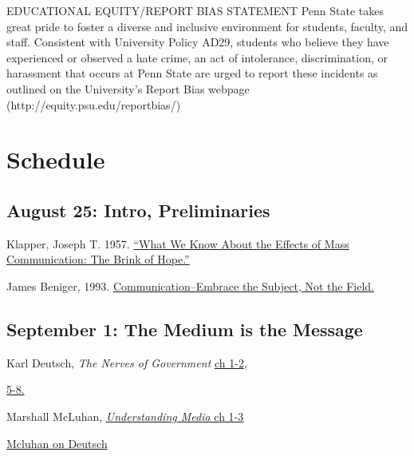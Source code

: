\vspace{-.1in}\documentclass[11pt]{article}
\begin{document}
EDUCATIONAL EQUITY/REPORT BIAS STATEMENT 
Penn State takes great pride to foster a diverse and inclusive environment for students, faculty, and staff. Consistent with University Policy AD29, students who believe they have experienced or observed a hate crime, an act of intolerance, discrimination, or harassment that occurs at Penn State are urged to report these incidents as outlined on the University’s Report Bias webpage (http://equity.psu.edu/reportbias/)



\clearpage
\section*{Schedule}




\subsection*{August 25: Intro, Preliminaries}


\noindent Klapper, Joseph T. 1957. \href{https://github.com/kmunger/MSMP21/blob/main/klapper.pdf}{``What We Know About the Effects of Mass Communication: The Brink of Hope.''}


\noindent James Beniger, 1993. \href{https://github.com/kmunger/MSMP21/blob/main/beniger.pdf}{Communication--Embrace the Subject, Not the Field.}

\subsection*{September 1: The Medium is the Message}


Karl Deutsch, \textit{The Nerves of Government} \href{https://github.com/kmunger/MSMP21/blob/main/1.pdf}{ch 1-2},

\href{https://github.com/kmunger/MSMP21/blob/main/5.pdf}{5-8.}

\noindent Marshall McLuhan, \href{https://designopendata.files.wordpress.com/2014/05/understanding-media-mcluhan.pdf}{ \textit{Understanding Media} ch 1-3}

\noindent \href{https://www.jstor.org/stable/825125?seq=1#metadata_info_tab_contents}{Mcluhan on Deutsch}
\end{document}

